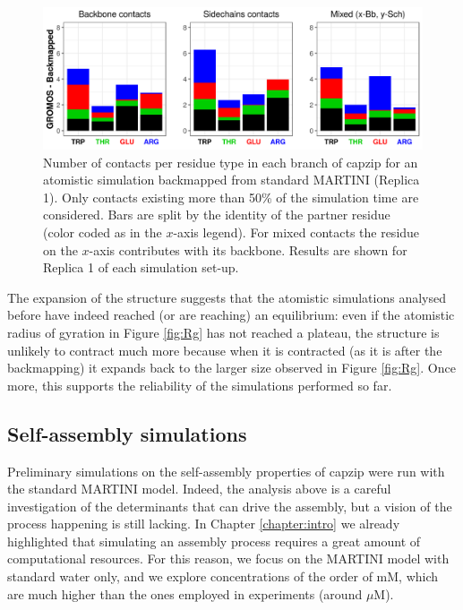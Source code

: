 \begin{figure}[p!]
\label{fig:backmap}
\vspace{1.5cm}
\centering
\includegraphics[width=0.95\linewidth]{3results_capsule/pics/contacts_BM.png} 
\caption[Backmapping simulations: contacts]{Number of contacts per residue type in each branch of capzip for an atomistic simulation backmapped from standard MARTINI (Replica 1). Only contacts existing more than 50\% of the simulation time are considered. Bars are split by the identity of the partner residue (color coded as in the $x$-axis legend). For mixed contacts the residue on the $x$-axis contributes with its backbone. Results are shown for Replica 1 of each simulation set-up.}
\label{fig:BM_contacts}
\end{figure}

The expansion of the structure suggests that the atomistic simulations analysed before have indeed reached (or are reaching) an equilibrium: even if the atomistic radius of gyration in Figure \ref{fig:Rg} has not reached a plateau, the structure is unlikely to contract much more because when it is contracted (as it is after the backmapping) it expands back to the larger size observed in Figure \ref{fig:Rg}.
Once more, this supports the reliability of the simulations performed so far.

\subsection{Self-assembly simulations}
Preliminary simulations on the self-assembly properties of capzip were run with the standard MARTINI model. Indeed, the analysis above is a careful investigation of the determinants that can drive the assembly, but a vision of the process happening is still lacking.
%
In Chapter \ref{chapter:intro} we already highlighted that simulating an assembly process requires a great amount of computational resources. For this reason, we focus on the MARTINI model with standard water only, and we explore concentrations of the order of mM, which are much higher than the ones employed in experiments (around $\mu$M).

